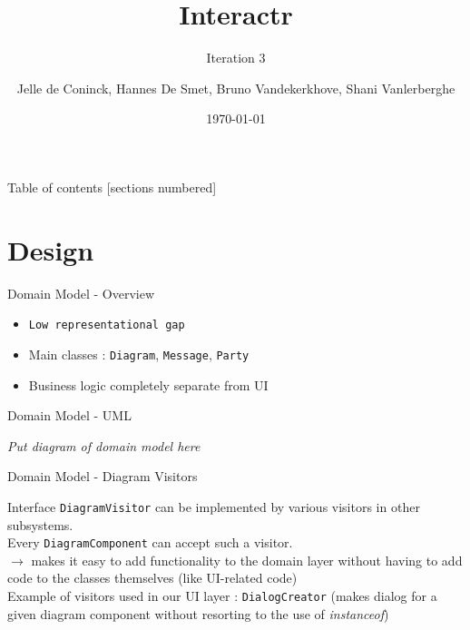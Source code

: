 \documentclass[10pt]{beamer}
\title{Interactr}
\subtitle{Iteration 3}
\date{\today}
\author{Jelle de Coninck, Hannes De Smet, Bruno Vandekerkhove, Shani Vanlerberghe}
\institute{KULeuven}
\begin{document}
\maketitle

\begin{frame}{Table of contents}
  [sections numbered]
  \tableofcontents[hideallsubsections]
\end{frame}

\section{Design}

\begin{frame}[fragile]{Domain Model - Overview}
	\begin{center}
	\begin{itemize}
	\item \texttt{Low representational gap}
	\item Main classes : \texttt{Diagram}, \texttt{Message}, \texttt{Party}
	\item Business logic completely separate from UI
	\end{itemize}
	\end{center}
\end{frame}

\begin{frame}[fragile]{Domain Model - UML}
	\begin{center}
	\textit{Put diagram of domain model here}
	\end{center}
\end{frame}

\begin{frame}[fragile]{Domain Model - Diagram Visitors}
	\begin{center}
	Interface \texttt{DiagramVisitor} can be implemented by various visitors in other subsystems.\\
	Every \texttt{DiagramComponent} can accept such a visitor.\\
	\vspace{0.5cm}
	$\rightarrow$ makes it easy to add functionality to the domain layer without having to add code to the classes themselves (like UI-related code)\\
	\vspace{0.5cm}
	\footnotesize Example of visitors used in our UI layer : \texttt{DialogCreator} (makes dialog for a given diagram component without resorting to the use of \textit{instanceof})
	\end{center}
\end{frame}
\end{document}
